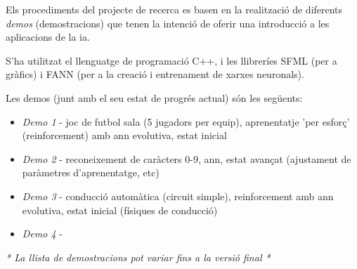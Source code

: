 Els procediments del projecte de recerca es basen en la realització de diferents \emph{demos} (demostracions)
que tenen la intenció de oferir una introducció a les aplicacions de la \ac{ia}.

S'ha utilitzat el llenguatge de programació C++, i les llibreríes SFML \cite{sfmllib} (per a gràfics) i FANN \cite{fannlib} (per a la
creació i entrenament de xarxes neuronals).

Les demos (junt amb el seu estat de progrés actual) són les següents:

\begin{itemize}
\item \emph{Demo 1} - joc de futbol sala (5 jugadors per equip), aprenentatje 'per esforç' (reinforcement) amb \ac{ann} evolutiva, estat inicial
\item \emph{Demo 2} - reconeixement de caràcters 0-9, \ac{ann}, estat avançat (ajustament de paràmetres d'aprenentatge, etc)
\item \emph{Demo 3} - conducció automàtica (circuit simple), reinforcement amb \ac{ann} evolutiva, estat inicial (físiques de conducció)
\item \emph{Demo 4} - 
\end{itemize}

\emph{* La llista de demostracions pot variar fins a la versió final *}

